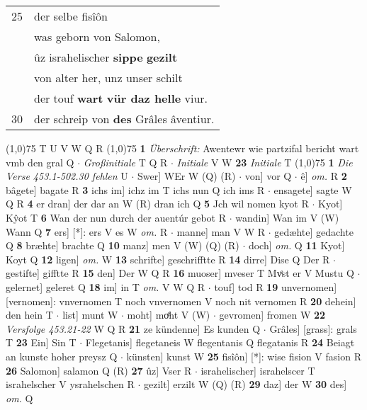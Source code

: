 \documentclass[8pt,a4paper,notitlepage]{article}
\begin{document}
\begin{table}[ht]
\begin{minipage}[t]{0.5\linewidth}
\begin{tabular}{rl}
25 & der selbe fisîôn\\ 
 & was geborn von Salomon,\\ 
 & ûz israhelischer \textbf{sippe} \textbf{gezilt}\\ 
 & von alter her, unz unser schilt\\ 
 & der touf \textbf{wart} \textbf{vür daz helle} viur.\\ 
30 & der schreip von \textbf{des} Grâles âventiur.\\ 
\end{tabular}
\scriptsize
\line(1,0){75} \newline
T U V W Q R \newline
\line(1,0){75} \newline
\textbf{1} \textit{Überschrift:} Awentewr wie partzifal bericht wart vmb den gral Q   $\cdot$ \textit{Großinitiale} T Q R   $\cdot$ \textit{Initiale} V W  \textbf{23} \textit{Initiale} T  \newline
\line(1,0){75} \newline
\textbf{1} \textit{Die Verse 453.1-502.30 fehlen} U   $\cdot$ Swer] WEr W (Q) (R)  $\cdot$ von] vor Q  $\cdot$ ê] \textit{om.} R \textbf{2} bâgete] bagate R \textbf{3} ichs im] ichz im T ichs nun Q ich ims R  $\cdot$ ensagete] sagte W Q R \textbf{4} er dran] der dar an W (R) dran ich Q \textbf{5} Jch wil nomen kyot R  $\cdot$ Kyot] Kŷot T \textbf{6} Wan der nun durch der auentúr gebot R  $\cdot$ wandin] Wan im V (W) Wann Q \textbf{7} ers] [*]: ers V es W \textit{om.} R  $\cdot$ manne] man V W R  $\cdot$ gedæhte] gedachte Q \textbf{8} bræhte] brachte Q \textbf{10} manz] men V (W) (Q) (R)  $\cdot$ doch] \textit{om.} Q \textbf{11} Kyot] Koyt Q \textbf{12} ligen] \textit{om.} W \textbf{13} schrifte] geschrifftte R \textbf{14} dirre] Dise Q Der R  $\cdot$ gestifte] gifftte R \textbf{15} den] Der W Q R \textbf{16} muoser] mveser T Mvͤst er V Mustu Q  $\cdot$ gelernet] geleret Q \textbf{18} im] in T \textit{om.} V W Q R  $\cdot$ touf] tod R \textbf{19} unvernomen] [vernomen]: vnvernomen T noch vnvernomen V noch nit vernomen R \textbf{20} dehein] den hein T  $\cdot$ list] munt W  $\cdot$ moht] moͤht V (W)  $\cdot$ gevromen] fromen W \textbf{22} \textit{Versfolge 453.21-22} W Q R  \textbf{21} ze kündenne] Es kunden Q  $\cdot$ Grâles] [grass]: grals T \textbf{23} Ein] Sin T  $\cdot$ Flegetanis] flegetaneis W flegentanis Q flegatanis R \textbf{24} Beiagt an kunste hoher preysz Q  $\cdot$ künsten] kunst W \textbf{25} fisîôn] [*]: wise fision V fasion R \textbf{26} Salomon] salamon Q (R) \textbf{27} ûz] Vser R  $\cdot$ israhelischer] israhelscer T israhelscher V ysrahelschen R  $\cdot$ gezilt] erzilt W (Q) (R) \textbf{29} daz] der W \textbf{30} des] \textit{om.} Q \newline
\end{minipage}
\end{table}
\end{document}
